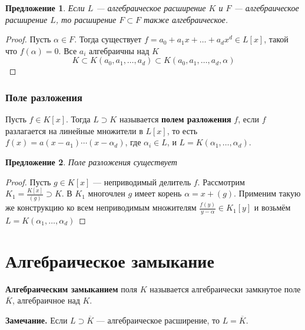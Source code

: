 \documentclass[a4paper]{article}
\numberwithin{theorem}{section}
\numberwithin{lemma}{section}
\newtheorem{proposition}{Предложение}
\numberwithin{proposition}{section}
\numberwithin{corollary}{section}
\begin{document}
\begin{proposition}
Если $L$ --- алгебраическое расширение $K$ и $F$ --- алгебраическое расширение $L$, то расширение $F \subset F$ также алгебраическое.
\end{proposition}

\begin{proof}
Пусть $\alpha \in F$. Тогда существует $f = a_0 + a_1 x + \ldots + a_d x^d \in L[x]$, такой что $f(\alpha) = 0$. Все $a_i$ алгебраичны над $K$
\[K \subset K(a_0, a_1, \ldots, a_d) \subset K(a_0, a_1, \ldots, a_d, \alpha)\]
\end{proof}

\subsubsection*{Поле разложения}

Пусть $f \in K[x]$. Тогда $L \supset K$ называется \textbf{полем разложения} $f$, если $f$ разлагается на линейные множители в $L[x]$,
то есть $f(x) = a(x - a_1) \cdots (x - \alpha_d)$,
где $\alpha_i \in L$, и $L = K(\alpha_1, \ldots, \alpha_d)$.

\begin{proposition}
Поле разложения существует
\end{proposition}
\begin{proof}
Пусть $g \in K[x]$ --- неприводимый делитель $f$.
Рассмотрим $K_1 = \frac{K[x]}{(g)} \supset K$. В $K_1$ многочлен $g$
имеет корень $\alpha = x + (g)$. Применим такую же конструкцию
ко всем неприводимым множителям $\frac{f(y)}{y - \alpha} \in K_1[y]$
и возьмём $L = K(\alpha_1, \ldots, \alpha_d)$
\end{proof}

\section{Алгебраическое замыкание}
\textbf{Алгебраическим замыканием} поля $K$ называется алгебраически замкнутое поле $\overline{K}$, алгебраичное над $K$.

\textbf{Замечание.} Если $L \supset \overline{K}$ --- алгебраическое расширение, то $L = \overline{K}$.
\end{document}
